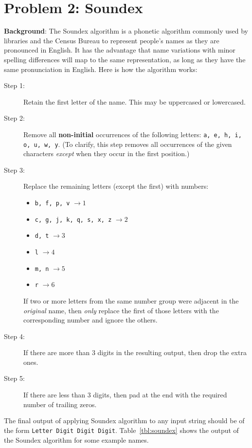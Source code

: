 \documentclass[11pt]{article}
\begin{document}
\section*{Problem 2: Soundex} %
\label{sec:problem_2}
\textbf{Background}: The Soundex algorithm is a phonetic algorithm
commonly used by libraries and the Census Bureau to represent people's
names as they are pronounced in English. It has the advantage that
name variations with minor spelling differences will map to the same
representation, as long as they have the same pronunciation in
English. Here is how the algorithm works:
\begin{description}
	\item[Step 1:] Retain the first letter of the name. This may
          be uppercased or lowercased.
	\item[Step 2:] Remove all \textbf{non-initial} occurrences of
          the following letters: \texttt{a, e, h, i, o, u, w, y}. (To
          clarify, this step removes all occurrences of the given
          characters \emph{except} when they occur in the first
          position.)
	\item[Step 3:] Replace the remaining letters (except the
          first) with numbers:
	\begin{itemize}
		\item \texttt{b, f, p, v} $\rightarrow 1$
		\item \texttt{c, g, j, k, q, s, x, z} $\rightarrow 2$
		\item \texttt{d, t} $\rightarrow 3$
		\item \texttt{l} $\rightarrow 4$
		\item \texttt{m, n} $\rightarrow 5$
		\item \texttt{r} $\rightarrow 6$
	\end{itemize}
 	If two or more letters from the same number group were
        adjacent in the \emph{original} name, then \emph{only} replace
        the first of those letters with the corresponding number and
        ignore the others.
 	\item[Step 4:] If there are more than $3$ digits in the
          resulting output, then drop the extra ones.
 	\item[Step 5:] If there are less than $3$ digits, then pad at
          the end with the required number of trailing zeros.
\end{description}


 The final output of applying Soundex algorithm to any input string
 should be of the form \texttt{Letter Digit Digit
   Digit}. Table~\ref{tbl:soundex} shows the output of the Soundex
 algorithm for some example names. 
\end{document}
